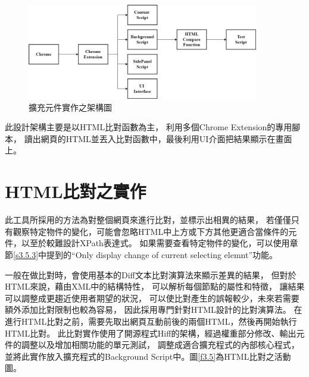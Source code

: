 \begin{figure}[H]
    \centering
    \includegraphics[width=0.9\textwidth]{picture/ch3-systemStucture.png}
    \caption{擴充元件實作之架構圖}
    \label{f3.4}
\end{figure}

此設計架構主要是以HTML比對函數為主，
利用多個Chrome Extension的專用腳本，
讀出網頁的HTML並丟入比對函數中，最後利用UI介面把結果顯示在畫面上。

\section{HTML比對之實作}\label{s3.3}
此工具所採用的方法為對整個網頁來進行比對，並標示出相異的結果，
若僅僅只有觀察特定物件的變化，可能會忽略HTML中上方或下方其他更適合當條件的元件，以至於較難設計XPath表達式。
如果需要查看特定物件的變化，可以使用章節\ref{s3.5.3}中提到的``Only display change of current selecting elemnt''功能。

一般在做比對時，會使用基本的Diff文本比對演算法來顯示差異的結果，
但對於HTML來說，藉由XML中的結構特性，
可以解析每個節點的屬性和特徵，
讓結果可以調整成更趨近使用者期望的狀況，
可以使比對產生的誤報較少，未來若需要額外添加比對限制也較為容易，
因此採用專門針對HTML設計的比對演算法。
在進行HTML比對之前，需要先取出網頁互動前後的兩個HTML，然後再開始執行HTML比對\cite{HTML-Comparison-Algorithm}。
此比對實作使用了開源程式Hiff\cite{Hiff}的架構，經過權重部分修改、輸出元件的調整以及增加相關功能的單元測試，
調整成適合擴充程式的內部核心程式，並將此實作放入擴充程式的Background Script中。圖\ref{f3.5}為HTML比對之活動圖。

